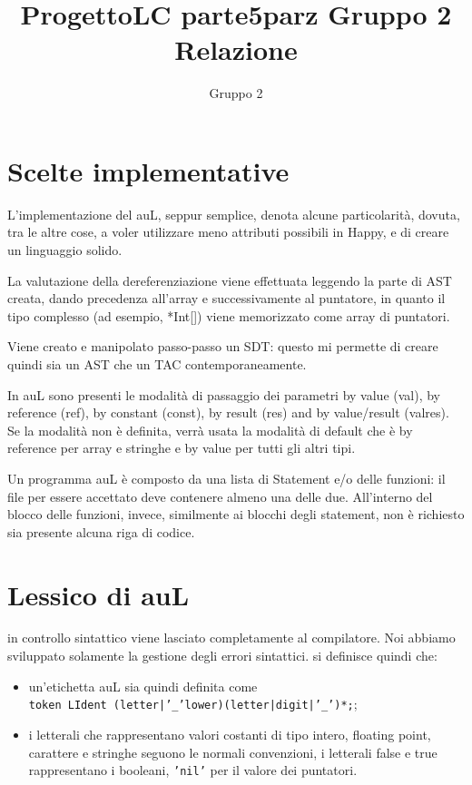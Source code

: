 \documentclass{article}
\title{ProgettoLC parte5parz Gruppo 2 Relazione}
\author{Gruppo 2 }
\begin{document}
\maketitle

\section{Scelte implementative}
L'implementazione del auL, seppur semplice, denota alcune particolarità, dovuta, tra le altre cose, a voler utilizzare
meno attributi possibili in Happy, e di creare un linguaggio solido.

La valutazione della dereferenziazione viene effettuata leggendo la parte di AST creata, dando precedenza all'array
e successivamente al puntatore, in quanto il tipo complesso (ad esempio, *Int[]) viene memorizzato come array di
puntatori.

Viene creato e manipolato passo-passo un SDT: questo mi permette di creare quindi sia un AST che un TAC contemporaneamente.

In auL sono presenti le modalità di passaggio dei parametri by value (val), by reference (ref), by constant (const), by 
result (res) and by value/result (valres). Se la modalità non è definita, verrà usata la modalità di default che è by 
reference per array e stringhe e by value per tutti gli altri tipi.

Un programma auL è composto da una lista di Statement e/o delle funzioni: il file per essere accettato deve contenere
almeno una delle due. All'interno del blocco delle funzioni, invece, similmente ai blocchi degli statement, non è richiesto
sia presente alcuna riga di codice.

\section{Lessico di auL}
in controllo sintattico viene lasciato completamente al compilatore. Noi abbiamo sviluppato solamente la gestione
degli errori sintattici. si definisce quindi che:
\begin{itemize}
	\item un'etichetta auL sia quindi definita come\\
		\texttt{token LIdent (letter|'\_'lower)(letter|digit|'\_')*;};
	
	\item i letterali che rappresentano valori costanti di tipo intero, floating point, carattere e stringhe 
	seguono le normali convenzioni, i letterali false e true rappresentano i booleani, \texttt{'nil'} per il valore
	dei puntatori.
\end{itemize}
\end{document}
